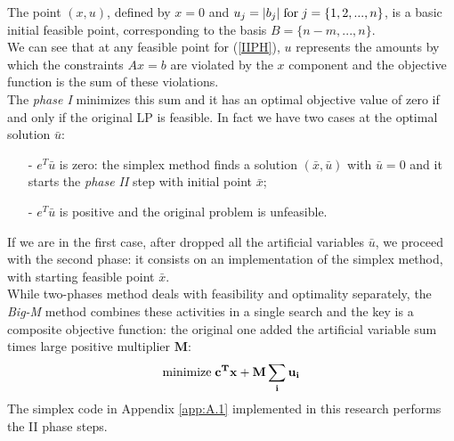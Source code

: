 \documentclass[a4paper,10 pt,titlepage,twoside]{report}
\theoremstyle{plain}
\theoremstyle{definition}
\theoremstyle{remark}
\begin{document}
The point $(x,u)$, defined by $x = 0$ and $u_{j} = |b_{j}| \text{\;for\;}j =\{1,2,...,n\}$, is a basic initial feasible point, corresponding to the basis $B = \{n-m,...,n\}$.\\ We can see that at any feasible point for (\ref{IIPH}), $u$ represents the amounts by which the constraints $Ax = b$ are violated by the $x$ component and the objective function is the sum of these violations. \\
The \textit{phase I} minimizes this sum and it has an optimal objective value of zero if and only if the original LP is feasible. In fact we have two cases at the optimal solution $\bar{u}$: 
\begin{itemize}
	\item[-]$e^{T}\bar{u}$ is zero: the simplex method finds a solution $(\bar{x},\bar{u})$ with $\bar{u}=0$ and it starts the \textit{phase II} step with initial point $\bar{x}$;
	\item[-]$e^{T}\bar{u}$ is positive and the original problem is unfeasible.
\end{itemize}
If we are in the first case, after dropped all the artificial variables $\bar{u}$, we proceed with the second phase: it consists on an implementation of the simplex method, with starting feasible point $\bar{x}$.\\ 
While two-phases method deals with feasibility and optimality separately, the \textit{Big-M} method combines these activities in a single search and the key is a composite objective function: the original one added the artificial variable sum times  large positive multiplier $\mathbf{M}$:\\
\begin{equation}
\text{minimize\;}\mathbf{c^{T}x+M \sum_{i}{u}_{i}}\\
\end{equation}
The simplex code in Appendix \ref{app:A.1} implemented in this research performs the II phase steps.
\end{document}
